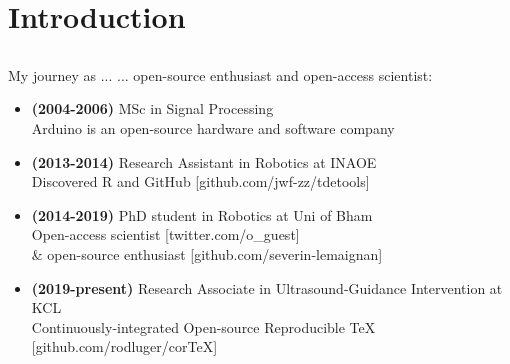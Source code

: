 \section{Introduction}

\subsection{}
{

\begin{frame}{My journey as ...}
... open-source enthusiast and open-access scientist:
 
\begin{itemize}	
	\item 
	\textbf{(2004-2006)} MSc in Signal Processing \\
	Arduino is an open-source hardware and software company
	\item \textbf{(2013-2014)} 
	Research Assistant in Robotics at INAOE \\
	Discovered R and GitHub [github.com/jwf-zz/tdetools]
	\item \textbf{(2014-2019)} 
	PhD student in Robotics at Uni of Bham \\
		Open-access scientist [twitter.com/o\_guest] \\
		\&
		open-source enthusiast [github.com/severin-lemaignan] 
	\item \textbf{(2019-present)} 
	Research Associate in Ultrasound-Guidance 
	Intervention at KCL \\
		Continuously-integrated Open-source Reproducible TeX
	[github.com/rodluger/corTeX]
\end{itemize}

	
\end{frame}
}



